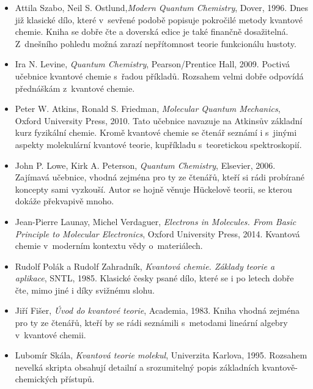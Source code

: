 \begin{itemize}

\item Attila Szabo, Neil S. Ostlund,\textit{Modern Quantum Chemistry}, Dover, 1996. Dnes již klasické dílo, které v~sevřené podobě popisuje pokročilé metody kvantové chemie. Kniha se dobře čte a doverská edice je také finančně dosažitelná. Z~dnešního pohledu možná zarazí nepřítomnost teorie funkcionálu hustoty. 
\item Ira N. Levine, \textit{Quantum Chemistry}, Pearson/Prentice Hall, 2009. Poctivá učebnice kvantové chemie s~řadou příkladů. Rozsahem velmi dobře odpovídá přednáškám z~kvantové chemie. 
\item Peter W. Atkins, Ronald S. Friedman, \textit{Molecular Quantum Mechanics}, Oxford University Press, 2010. Tato učebnice navazuje na Atkinsův základní kurz fyzikální chemie. Kromě kvantové chemie se čtenář seznámí i s~jinými aspekty molekulární kvantové teorie, kupříkladu s~teoretickou spektroskopií.  
\item John P. Lowe, Kirk A. Peterson, \textit{Quantum Chemistry}, Elsevier, 2006. Zajímavá učebnice, vhodná zejména pro ty ze čtenářů, kteří si rádi probírané koncepty sami vyzkouší. Autor se hojně věnuje H\"uckelově teorii, se kterou dokáže překvapivě mnoho.
\item Jean-Pierre Launay, Michel Verdaguer, \textit{Electrons in Molecules. From Basic Principle to Molecular Electronics}, Oxford University Press, 2014. Kvantová chemie v~moderním kontextu vědy o~materiálech. 
\item Rudolf Polák a Rudolf Zahradník, \textit{Kvantová chemie. Základy teorie a aplikace}, SNTL, 1985. Klasické česky psané dílo, které se i po letech dobře čte, mimo jiné i díky svižnému slohu.
\item Jiří Fišer, \textit{Úvod do kvantové teorie}, Academia, 1983. Kniha vhodná zejména pro ty ze čtenářů, kteří by se rádi seznámili s~metodami lineární algebry v~kvantové chemii.
\item Lubomír Skála, \textit{Kvantová teorie molekul}, Univerzita Karlova, 1995. Rozsahem nevelká skripta obsahují detailní a srozumitelný popis základních kvantově-chemických přístupů.

\end{itemize}
